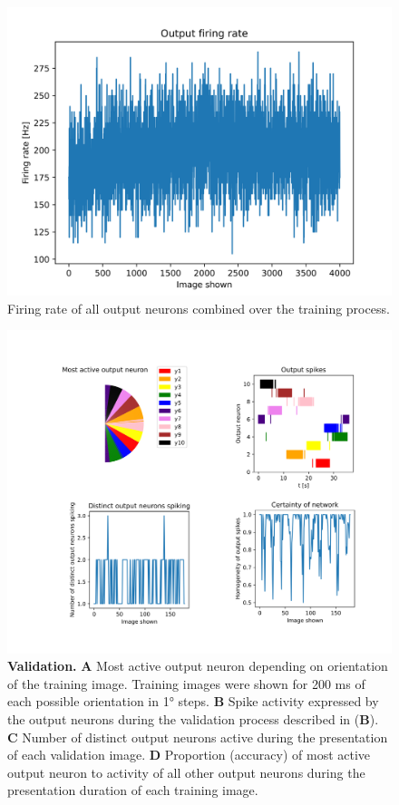 \begin{figure}
  \includegraphics[width=\linewidth]{figures/angleAdaptiveInh/outputFiringRate.png}
  \caption{ Firing rate of all output neurons combined over the training process. }
  \label{fig:angleNetworkAdaptiveInhibitionOutputFiringRate}
\end{figure}

\begin{figure}
  \includegraphics[width=\linewidth]{figures/angleAdaptiveInh/validation.png}
  \caption{\textbf{Validation.} \textbf{A} Most active output neuron depending on orientation of the training image. Training images were shown for 200 ms of each possible orientation in 1° steps. \textbf{B} Spike activity expressed by the output neurons during the validation process described in (\textbf{B}). \textbf{C} Number of distinct output neurons active during the presentation of each validation image. \textbf{D} Proportion (accuracy) of most active output neuron to activity of all other output neurons during the presentation duration of each training image.}
  \label{fig:angleNetworkAdaptiveInhibitionValidation}
\end{figure}

